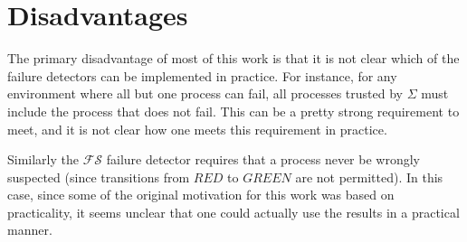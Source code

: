 \section{Disadvantages}
The primary disadvantage of most of this work is that it is not clear which of the failure detectors can be implemented
in practice. For instance, for any environment where all but one process can fail, all processes trusted by $\Sigma$
must include the process that does not fail. This can be a pretty strong requirement to meet, and it is not clear how
one meets this requirement in practice. 

Similarly the $\mathcal{FS}$ failure detector requires that a process never be wrongly suspected (since transitions from
$RED$ to $GREEN$ are not permitted). In this case, since some of the original motivation for this work was based on
practicality, it seems unclear that one could actually use the results in a practical manner.
